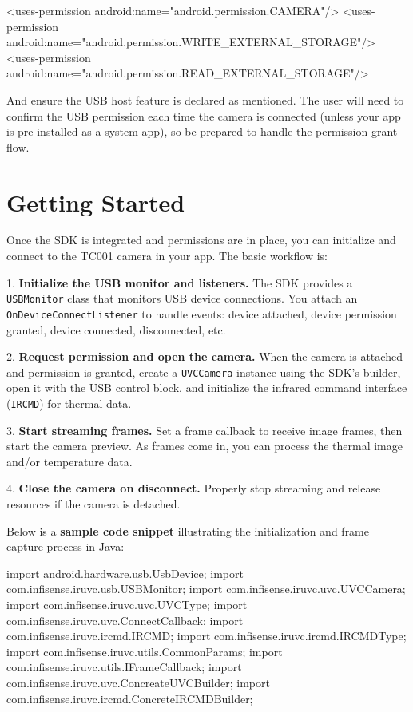 {    <uses-permission android:name="android.permission.CAMERA"/>
    <uses-permission android:name="android.permission.WRITE_EXTERNAL_STORAGE"/>
    <uses-permission android:name="android.permission.READ_EXTERNAL_STORAGE"/>

And ensure the USB host feature is declared as mentioned. The user will
need to confirm the USB permission each time the camera is connected
(unless your app is pre-installed as a system app), so be prepared to
handle the permission grant flow.

\section{Getting Started}

Once the SDK is integrated and permissions are in place, you can
initialize and connect to the TC001 camera in your app. The basic
workflow is:

1.  \textbf{Initialize the USB monitor and listeners.} The SDK provides a
    \texttt{USBMonitor} class that monitors USB device connections. You attach
    an \texttt{OnDeviceConnectListener} to handle events: device attached,
    device permission granted, device connected, disconnected, etc.

2.  \textbf{Request permission and open the camera.} When the camera is
    attached and permission is granted, create a \texttt{UVCCamera} instance
    using the SDK's builder, open it with the USB control block, and
    initialize the infrared command interface (\texttt{IRCMD}) for thermal
    data.

3.  \textbf{Start streaming frames.} Set a frame callback to receive image
    frames, then start the camera preview. As frames come in, you can
    process the thermal image and/or temperature data.

4.  \textbf{Close the camera on disconnect.} Properly stop streaming and
    release resources if the camera is detached.

Below is a \textbf{sample code snippet} illustrating the initialization and
frame capture process in Java:

    import android.hardware.usb.UsbDevice;
    import com.infisense.iruvc.usb.USBMonitor;
    import com.infisense.iruvc.uvc.UVCCamera;
    import com.infisense.iruvc.uvc.UVCType;
    import com.infisense.iruvc.uvc.ConnectCallback;
    import com.infisense.iruvc.ircmd.IRCMD;
    import com.infisense.iruvc.ircmd.IRCMDType;
    import com.infisense.iruvc.utils.CommonParams;
    import com.infisense.iruvc.utils.IFrameCallback;
    import com.infisense.iruvc.uvc.ConcreateUVCBuilder;
    import com.infisense.iruvc.ircmd.ConcreteIRCMDBuilder;

}
